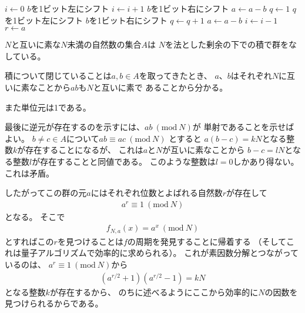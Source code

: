\documentclass[a4paper, 10pt]{jsarticle}
\begin{document}
\begin{algorithm}[H]
	\caption{$a \div b = q \cdots r$}
	\label{割り算のアルゴリズム}
	\begin{algorithmic}[1]
		\STATE $i \leftarrow 0$
		\STATE $b$を1ビット左にシフト
		\STATE $i \leftarrow i + 1$
		\ENDWHILE
		\STATE $b$を1ビット右にシフト
		\STATE $a \leftarrow a - b$
		\STATE $q \leftarrow 1$
		\STATE $q$を1ビット左にシフト
		\STATE $b$を1ビット右にシフト
		\STATE $q \leftarrow q + 1$
		\STATE $a \leftarrow a - b$
		\ENDIF
		\STATE $i \leftarrow i - 1$
		\ENDWHILE
		\STATE $r \leftarrow a$
	\end{algorithmic}
\end{algorithm}

$N$と互いに素な$N$未満の自然数の集合$A$は
$N$を法とした剰余の下での積で群をなしている。
\begin{enumerate*}
	\item 積について閉じていることは$a, b \in A$を取ってきたとき、
	$a$、$b$はそれぞれ$N$に互いに素なことから$ab$も$N$と互いに素で
	あることから分かる。
	\item また単位元は1である。
	\item 最後に逆元が存在するのを示すには、$ab \ (\mathrm{mod} \ N)$が
	単射であることを示せばよい。
	$b \neq c \in A$について$ab \equiv ac \ (\mathrm{mod} \ N)$
	とすると
	$a(b - c) = kN$となる整数$k$が存在することになるが、
	これは$a$と$N$が互いに素なことから
	$b - c = lN$となる整数$l$が存在することと同値である。
	このような整数は$l = 0$しかあり得ない。
	これは矛盾。
\end{enumerate*}
したがってこの群の元$a$にはそれぞれ位数とよばれる自然数$r$が存在して
\begin{align}
	a^r \equiv 1 \ (\mathrm{mod} \ N)
\end{align}
となる。
そこで
\begin{align}
	f_{N, a} (x) = a^x \ (\mathrm{mod} \ N)
\end{align}
とすればこの$r$を見つけることは$f$の周期を発見することに帰着する
（そしてこれは量子アルゴリズムで効率的に求められる）。
これが素因数分解とつながっているのは、
$a^{r} \equiv 1 \ (\mathrm{mod} \ N)$から
\begin{align}
	\left( a^{r/2} + 1 \right) \left( a^{r/2} - 1 \right)
	= kN
\end{align}
となる整数$k$が存在するから、
のちに述べるようにここから効率的に$N$の因数を見つけられるからである。
\end{document}
